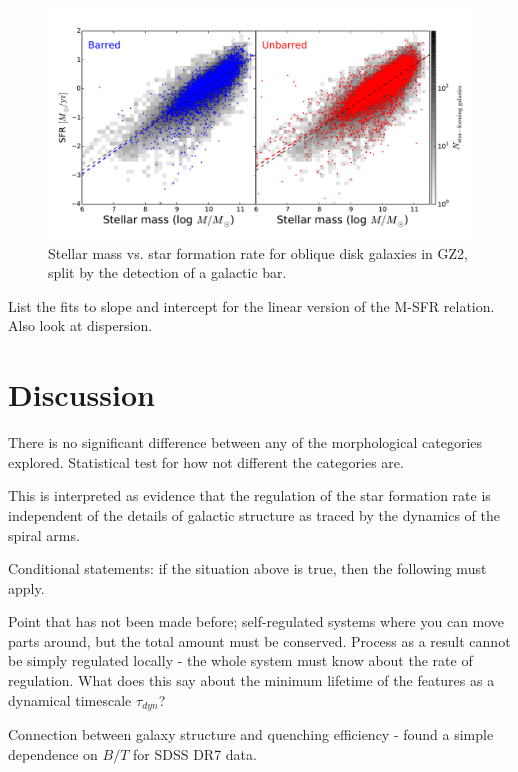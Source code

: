 \documentclass{emulateapj}
\begin{document}
\begin{figure}
\includegraphics[angle=0,width=7.0in]{figures/ms_bar.pdf}
\caption{Stellar mass vs. star formation rate for oblique disk galaxies in GZ2, split by the detection of a galactic bar. 
\label{fig-bar}}
\end{figure}

List the fits to slope and intercept for the linear version of the M-SFR relation. Also look at dispersion. 


\section{Discussion}\label{sec-discussion}

There is no significant difference between any of the morphological categories explored. Statistical test for how not different the categories are. 

This is interpreted as evidence that the regulation of the star formation rate is independent of the details of galactic structure as traced by the dynamics of the spiral arms. 

Conditional statements: if the situation above is true, then the following must apply. 

Point that has not been made before; self-regulated systems where you can move parts around, but the total amount must be conserved. Process as a result cannot be simply regulated locally - the whole system must know about the rate of regulation. What does this say about the minimum lifetime of the features as a dynamical timescale $\tau_{dyn}$? 

Connection between galaxy structure and quenching efficiency - \citet{oma14} found a simple dependence on $B/T$ for SDSS DR7 data. 
\end{document}
